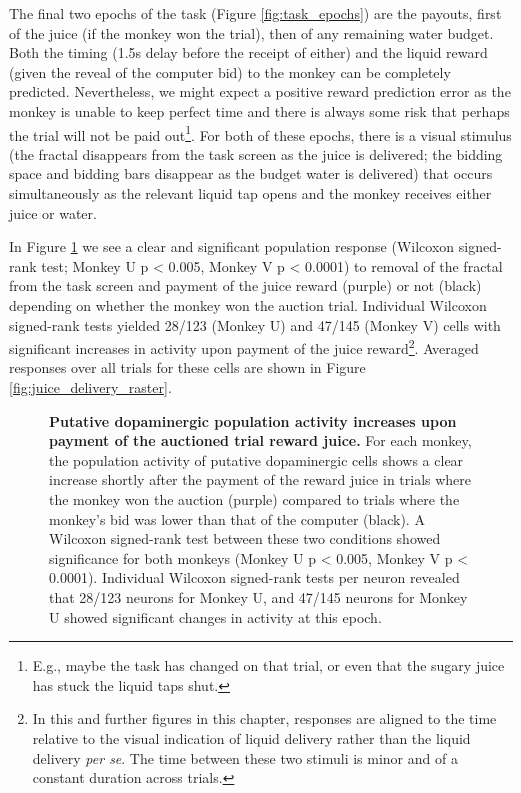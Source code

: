 The final two epochs of the task (Figure \ref{fig:task_epochs}) are the payouts, first of the juice (if the monkey won the trial), then of any remaining water budget. Both the timing (1.5s delay before the receipt of either) and the liquid reward (given the reveal of the computer bid) to the monkey can be completely predicted. Nevertheless, we might expect a positive reward prediction error as the monkey is unable to keep perfect time and there is always some risk that perhaps the trial will not be paid out\footnote{E.g., maybe the task has changed on that trial, or even that the sugary juice has stuck the liquid taps shut.}. For both of these epochs, there is a visual stimulus (the fractal disappears from the task screen as the juice is delivered; the bidding space and bidding bars disappear as the budget water is delivered) that occurs simultaneously as the relevant liquid tap opens and the monkey receives either juice or water.

In Figure \ref{fig:juice_delivery} we see a clear and significant population response (Wilcoxon signed-rank test; Monkey U p < 0.005, Monkey V p < 0.0001) to removal of the fractal from the task screen and payment of the juice reward (purple) or not (black) depending on whether the monkey won the auction trial. Individual Wilcoxon signed-rank tests yielded 28/123 (Monkey U) and 47/145 (Monkey V) cells with significant increases in activity upon payment of the juice reward\footnote{In this and further figures in this chapter, responses are aligned to the time relative to the visual indication of liquid delivery rather than the liquid delivery \textit{per se}. The time between these two stimuli is minor and of a constant duration across trials.}. Averaged responses over all trials for these cells are shown in Figure \ref{fig:juice_delivery_raster}.

\begin{figure}[p] 
\centering    

\caption[Putative dopaminergic population activity increases upon payment of the auctioned trial reward juice.]{\textbf{Putative dopaminergic population activity increases upon payment of the auctioned trial reward juice.} For each monkey, the population activity of putative dopaminergic cells shows a clear increase shortly after the payment of the reward juice in trials where the monkey won the auction (purple) compared to trials where the monkey's bid was lower than that of the computer (black). A Wilcoxon signed-rank test between these two conditions showed significance for both monkeys (Monkey U p < 0.005, Monkey V p < 0.0001). Individual Wilcoxon signed-rank tests per neuron revealed that 28/123 neurons for Monkey U, and 47/145 neurons for Monkey U showed significant changes in activity at this epoch.}
\label{fig:juice_delivery}
\end{figure}

